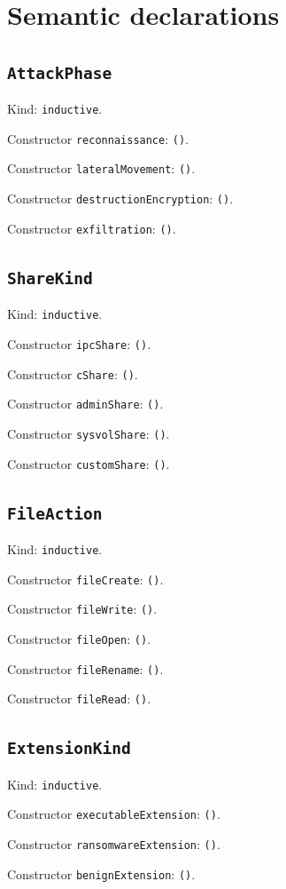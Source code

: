 \documentclass[11pt]{article}
\begin{document}
\section*{Semantic declarations}
\subsection*{\texttt{AttackPhase}}
\noindent Kind: \texttt{inductive}.\par
\noindent Constructor \texttt{reconnaissance}: \texttt{()}.\par
\noindent Constructor \texttt{lateralMovement}: \texttt{()}.\par
\noindent Constructor \texttt{destructionEncryption}: \texttt{()}.\par
\noindent Constructor \texttt{exfiltration}: \texttt{()}.\par
\subsection*{\texttt{ShareKind}}
\noindent Kind: \texttt{inductive}.\par
\noindent Constructor \texttt{ipcShare}: \texttt{()}.\par
\noindent Constructor \texttt{cShare}: \texttt{()}.\par
\noindent Constructor \texttt{adminShare}: \texttt{()}.\par
\noindent Constructor \texttt{sysvolShare}: \texttt{()}.\par
\noindent Constructor \texttt{customShare}: \texttt{()}.\par
\subsection*{\texttt{FileAction}}
\noindent Kind: \texttt{inductive}.\par
\noindent Constructor \texttt{fileCreate}: \texttt{()}.\par
\noindent Constructor \texttt{fileWrite}: \texttt{()}.\par
\noindent Constructor \texttt{fileOpen}: \texttt{()}.\par
\noindent Constructor \texttt{fileRename}: \texttt{()}.\par
\noindent Constructor \texttt{fileRead}: \texttt{()}.\par
\subsection*{\texttt{ExtensionKind}}
\noindent Kind: \texttt{inductive}.\par
\noindent Constructor \texttt{executableExtension}: \texttt{()}.\par
\noindent Constructor \texttt{ransomwareExtension}: \texttt{()}.\par
\noindent Constructor \texttt{benignExtension}: \texttt{()}.\par
\end{document}
